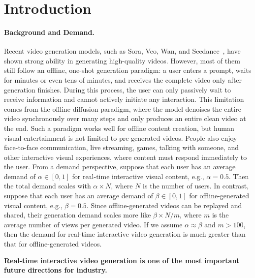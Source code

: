 \section{Introduction}

\paragraph{Background and Demand.}
Recent video generation models, such as Sora, Veo, Wan, and Seedance~\citep{videoworldsimulators2024,veo,wan2025wan,seedance2026seedance}, have shown strong ability in generating high-quality videos. However, most of them still follow an offline, one-shot generation paradigm: a user enters a prompt, waits for minutes or even tens of minutes, and receives the complete video only after generation finishes. 
During this process, the user can only passively wait to receive information and cannot actively initiate any interaction.
This limitation comes from the offline diffusion paradigm, where the model denoises the entire video synchronously over many steps and only produces an entire clean video at the end. Such a paradigm works well for offline content creation, but human visual entertainment is not limited to pre-generated videos. People also enjoy face-to-face communication, live streaming, games, talking with someone, and other interactive visual experiences, where content must respond immediately to the user. From a demand perspective, suppose that each user has an average demand of $\alpha \in [0,1]$ for real-time interactive visual content, e.g., $\alpha = 0.5$. Then the total demand scales with $\alpha \times N$, where $N$ is the number of users. In contrast, suppose that each user has an average demand of $\beta \in [0,1]$ for offline-generated visual content, e.g., $\beta = 0.5$. Since offline-generated videos can be replayed and shared, their generation demand scales more like $\beta \times N / m$, where $m$ is the average number of views per generated video. If we assume $\alpha \approx \beta$ and $m > 100$, then the demand for real-time interactive video generation is much greater than that for offline-generated videos.


\begin{center}
\textbf{Real-time interactive video generation is one of the most important future directions for industry.}
\end{center}
\vspace{-6pt}

